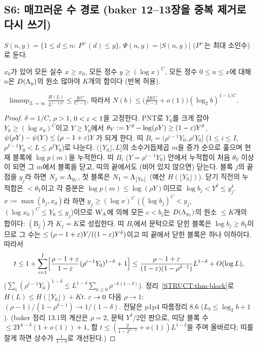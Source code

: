 \subsection{S6: 매끄러운 수 경로 (baker 12--13장을 중복 제거로 다시 쓰기)}
\label{STRUCT:sec-S6}

$S(n,y)=\{1\le d\le n:\ P^+(d)\le y\}$, $\Psi(n,y)=|S(n,y)|$ ($P^+$는 최대 소인수)로 둔다.

\begin{hypothesis}\label{STRUCT:hyp-WLam}
$x_0$가 있어 모든 실수 $x\ge x_0$, 모든 정수 $y\ge(\log x)^C$, 모든 정수 $0\le n\le x$에 대해 $n$은 $D(\Lambda_y)$의 원소 많아야 $K$개의 합이다 (반복 허용). \OPEN
\end{hypothesis}

\begin{theorem}[묶음 혼합진법]\label{STRUCT:thm-smooth-bundle}
\ $\displaystyle\limsup_{L\to\infty}\frac{H(L)}{L^{1-1/C}}\le\frac{KC}{C-1}$, 따라서 $N(b)\le\bigl(\frac{2KC}{C-1}+o(1)\bigr)(\log_2b)^{1-1/C}$.
\end{theorem}
\begin{proof}
$\delta=1/C$, $\rho>1$, $0<\varepsilon<1$을 고정한다. PNT로 $Y_0$를 크게 잡아 $Y_0\ge(\log x_0)^C$이고 $Y\ge Y_0$에서 $\theta_Y:=Y^\delta-\log(\rho Y)\ge(1-\varepsilon)Y^\delta$, $\psi(\rho Y)-\psi(Y)\le(\rho-1+\varepsilon)Y$가 되게 한다. 띠 $B_i=(\rho^{i-1}Y_0,\rho^iY_0]$ ($1\le i\le I$, $\rho^{I-1}Y_0<L\le\rho^IY_0$)로 나눈다.
$(\lfloor Y_0\rfloor,L]$의 소수거듭제곱 $m$을 증가 순으로 훑으며 현재 블록에 $\log p(m)$을 누적한다. 띠 $B_i$ ($Y=\rho^{i-1}Y_0$) 안에서 누적합이 처음 $\theta_Y$ 이상이 되면 그 $m$에서 블록을 닫고, 띠의 끝에서도 (비어 있지 않으면) 닫는다. 블록 $j$의 끝점을 $y_j$라 하면 $N_j=\Lambda_{y_j}$, 첫 블록은 $N_1=\Lambda_{\lfloor Y_0\rfloor}$ (예산 $H(\lfloor Y_0\rfloor)$).
닫기 직전의 누적합은 $<\theta_Y$이고 각 증분은 $\log p(m)\le\log(\rho Y)$이므로 $\log b_j<Y^\delta\le y_j^\delta$. $x:=\max(b_j,x_0)$라 하면 $y_j\ge(\log x)^C$ ($(\log b_j)^C<y_j$, $(\log x_0)^C\le Y_0\le y_j$)이므로 $\mathrm W_\Lambda$에 의해 모든 $c<b_j$는 $D(\Lambda_{y_j})$의 원소 $\le K$개의 합이다: $(\mathrm B_j)$가 $K_j=K$로 성립한다.
띠 $B_i$에서 문턱으로 닫힌 블록은 $\log b_j\ge\theta_Y$이므로 그 수는 $\le(\rho-1+\varepsilon)Y/((1-\varepsilon)Y^\delta)$이고 띠 끝에서 닫힌 블록은 하나 이하이다. 따라서
\[
t\le1+\sum_{i=1}^I\Bigl[\frac{\rho-1+\varepsilon}{1-\varepsilon}(\rho^{i-1}Y_0)^{1-\delta}+1\Bigr]\le\frac{\rho-1+\varepsilon}{(1-\varepsilon)(1-\rho^{\delta-1})}L^{1-\delta}+O(\log L),
\]
($\sum_i(\rho^{i-1}Y_0)^{1-\delta}\le L^{1-\delta}\sum_{k\ge0}\rho^{-k(1-\delta)}$). 정리~\ref{STRUCT:thm-block}로 $H(L)\le H(\lfloor Y_0\rfloor)+Kt$. $\varepsilon\to0$ 다음 $\rho\to1$: $(\rho-1)/(1-\rho^{\delta-1})\to1/(1-\delta)$. 전달은 p1p4 따름정리 8.6 ($L_b\le\log_2b+1$).
(baker 정리 13.1의 계산은 $\rho=2$, 문턱 $Y^\delta/2$인 판으로, 띠당 블록 수 $\le2Y^{1-\delta}(1+o(1))+1$, 합 $t\le(\frac{2}{1-2^{\delta-1}}+o(1))L^{1-\delta}$을 주며 올바르다; 띠를 잘게 하면 상수가 $\frac{1}{1-\delta}$로 개선된다.)
\end{proof}

